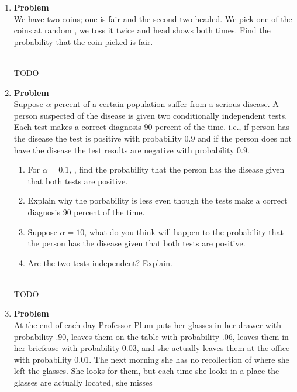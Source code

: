 \documentclass[12pt]{article}
\newenvironment{Ex}{\textbf{Problem}\vspace{.75em}\\}{}
\begin{document}
\begin{enumerate}
\item
  \begin{Ex}
    We have two coins; one is fair and the second two headed. We pick
    one of the coins at random , we toss it twice and head shows both
    times. Find the probability that the coin picked is fair.
    \begin{solution} \hfill \\
      {\huge TODO}
    \end{solution}
  \end{Ex}
\item
  \begin{Ex}
    Suppose $\alpha$ percent of a certain population suffer from a
    serious disease. A person suspected of the disease is given two
    conditionally independent tests. Each test makes a correct
    diagnosis 90 percent of the time. i.e., if person has the disease
    the test is positive with probability $0.9$ and if the person does
    not have the disease the test results are negative with
    probability $0.9$.
    \begin{enumerate}
    \item For $\alpha = 0.1$, , find the probability that the person
      has the disease given that both tests are positive.
    \item Explain why the porbability is less even though the tests
      make a correct diagnosis 90 percent of the time.
    \item Suppose $\alpha = 10$, what do you think will happen to the
      probability that the person has the disease given that both
      tests are positive.
    \item Are the two tests independent? Explain.
    \end{enumerate}
    \begin{solution} \hfill \\
      {\huge TODO}
    \end{solution}
  \end{Ex}
\item
  \begin{Ex}
    At the end of each day Professor Plum puts her glasses in her
    drawer with probability $.90$, leaves them on the table with
    probability $.06$, leaves them in her briefcase with probability
    $0.03$, and she actually leaves them at the office with
    probability $0.01$. The next morning she has no recollection of
    where she left the glasses. She looks for them, but each time she
    looks in a place the glasses are actually located, she misses

\end{Ex}
\end{enumerate}
\end{document}
